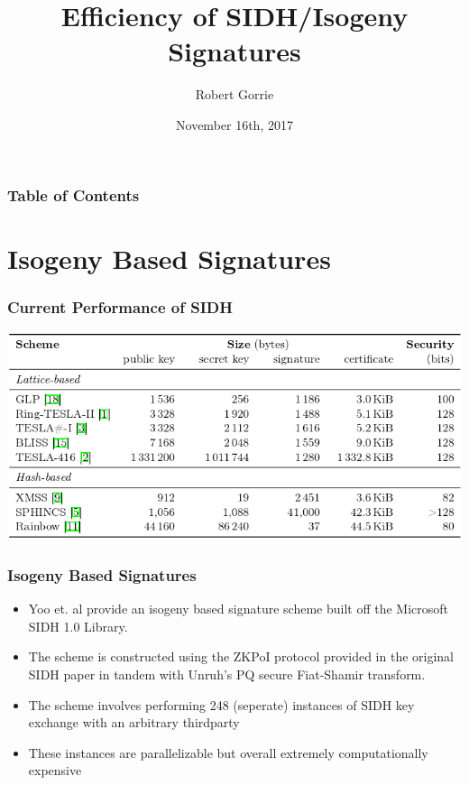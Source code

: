 \documentclass{beamer}
\title[SIDH]{Efficiency of SIDH/Isogeny Signatures}
\author{Robert Gorrie}
\institute[Comp Sci 2S03]{Department of Computing \& Software, McMaster University}
\date{November 16th, 2017}
\begin{document}
\begin{frame}
\titlepage
\end{frame}

\begin{frame}
\frametitle{Table of Contents}
\tableofcontents
\end{frame}


\section{Isogeny Based Signatures}


\begin{frame}
\frametitle{Current Performance of SIDH}
\includegraphics[scale=0.43]{sigcomparison.png}
\end{frame}

\begin{frame}
\frametitle{Isogeny Based Signatures}
\begin{itemize}
\item Yoo et. al provide an isogeny based signature scheme built off the Microsoft SIDH 1.0 Library.
\item The scheme is constructed using the ZKPoI protocol provided in the original SIDH paper in tandem with Unruh's PQ secure Fiat-Shamir transform.
\item The scheme involves performing 248 (seperate) instances of SIDH key exchange with an arbitrary thirdparty
\item These instances are parallelizable but overall extremely computationally expensive
\end{itemize}
\end{frame}
\end{document}
